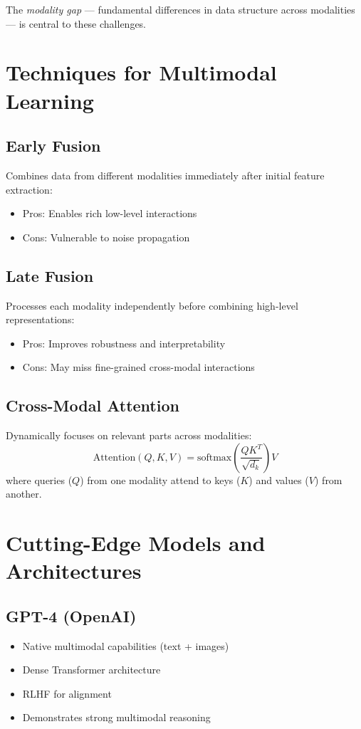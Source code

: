 \documentclass[openany]{book}
\begin{document}
The \textit{modality gap} — fundamental differences in data structure across 
modalities — is central to these challenges.

\section{Techniques for Multimodal Learning}

\subsection{Early Fusion}
Combines data from different modalities immediately after initial feature 
extraction:
\begin{itemize}
    \item Pros: Enables rich low-level interactions
    \item Cons: Vulnerable to noise propagation
\end{itemize}

\subsection{Late Fusion}
Processes each modality independently before combining high-level 
representations:
\begin{itemize}
    \item Pros: Improves robustness and interpretability
    \item Cons: May miss fine-grained cross-modal interactions
\end{itemize}

\subsection{Cross-Modal Attention}
Dynamically focuses on relevant parts across modalities:
\begin{equation}
\text{Attention}(Q,K,V) = \text{softmax}\left(\frac{QK^T}{\sqrt{d_k}}\right)V
\end{equation}
where queries ($Q$) from one modality attend to keys ($K$) and values ($V$) 
from another.

\section{Cutting-Edge Models and Architectures}

\subsection{GPT-4 (OpenAI)}
\begin{itemize}
    \item Native multimodal capabilities (text + images)
    \item Dense Transformer architecture
    \item RLHF for alignment
    \item Demonstrates strong multimodal reasoning
\end{itemize}
\end{document}
